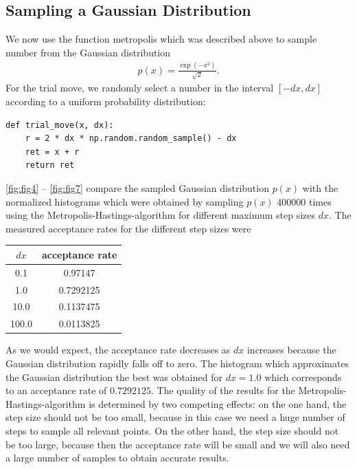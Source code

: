 \documentclass[a4paper,10pt,bibtotoc]{scrartcl}
\begin{document}
\subsection{Sampling a Gaussian Distribution}
We now use the function metropolis which was described above to sample number from the Gaussian distribution
\begin{align}
p(x) = \frac{\exp\left(-x^2\right)}{\sqrt{2}}.
\end{align}
For the trial move, we randomly select a number in the interval $\left[-dx, dx\right]$ according to a uniform probability distribution:
\begin{lstlisting}
def trial_move(x, dx):
    r = 2 * dx * np.random.random_sample() - dx
    ret = x + r
    return ret
\end{lstlisting}
\autoref{fig:fig4} -- \autoref{fig:fig7} compare the sampled Gaussian distribution $p(x)$ with the normalized histograms which were obtained by sampling $p(x)$ 400000 times using the Metropolis-Hastings-algorithm for different maximum step sizes $dx$.
The measured acceptance rates for the different step sizes were
\begin{table}[H]
\center
\begin{tabular}{cc}
\toprule
$dx$ & acceptance rate\\\midrule
0.1 & 0.97147\\
1.0 & 0.7292125\\
10.0 & 0.1137475\\
100.0 & 0.0113825\\
\bottomrule
\end{tabular}
\end{table}
\noindent As we would expect, the acceptance rate decreases as $dx$ increases because the Gaussian distribution rapidly falls off to zero.
The histogram which approximates the Gaussian distribution the best was obtained for $dx=1.0$ which corresponds to an acceptance rate of $0.7292125$.
The quality of the results for the Metropolis-Hastings-algorithm is determined by two competing effects: on the one hand, the step size should not be too small, because in this case we need a huge number of steps to sample all relevant points.
On the other hand, the step size should not be too large, because then the acceptance rate will be small and we will also need a large number of samples to obtain accurate results.
\end{document}

